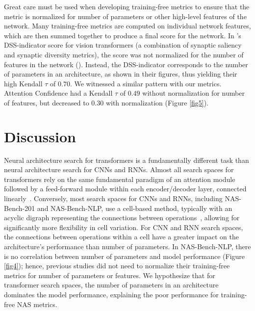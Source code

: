 \documentclass[11pt]{article}
\begin{document}
    Great care must be used when developing training-free metrics to ensure that the metric is normalized for number of parameters or other high-level features of the network. Many training-free metrics are computed on individual network features, which are then summed together to produce a final score for the network. In \citeauthor{zhou_training-free_2022}'s DSS-indicator score for vision transformers (a combination of synaptic saliency and synaptic diversity metrics), the score was not normalized for the number of features in the network (\citeyear{zhou_training-free_2022}). Instead, the DSS-indicator corresponds to the number of parameters in an architecture, as shown in their figures, thus yielding their high Kendall $\tau$ of $0.70$. We witnessed a similar pattern with our metrics. Attention Confidence had a Kendall $\tau$ of $0.49$ without normalization for number of features, but decreased to $0.30$ with normalization (Figure \ref{fig5}).

\section{Discussion}

    Neural architecture search for transformers is a fundamentally different task than neural architecture search for CNNs and RNNs. Almost all search spaces for transformers rely on the same fundamental paradigm of an attention module followed by a feed-forward module within each encoder/decoder layer, connected linearly~\cite{wang_hat_2020, yin_autotinybert_2021, zhao_memory-efficient_2021}. Conversely, most search spaces for CNNs and RNNs, including NAS-Bench-201 and NAS-Bench-NLP, use a cell-based method, typically with an acyclic digraph representing the connections between operations~\cite{dong_nas-bench-201_2020, jing_nasabn_2020, klyuchnikov_nas-bench-nlp_2022, tan_mnasnet_2019}, allowing for significantly more flexibility in cell variation. For CNN and RNN search spaces, the connections between operations within a cell have a greater impact on the architecture's performance than number of parameters. In NAS-Bench-NLP, there is no correlation between number of parameters and model performance (Figure \ref{fig4}); hence, previous studies did not need to normalize their training-free metrics for number of parameters or features. We hypothesize that for transformer search spaces, the number of parameters in an architecture dominates the model performance, explaining the poor performance for training-free NAS metrics.
\end{document}
